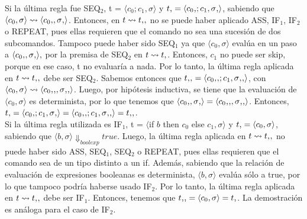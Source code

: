 \documentclass{article}
\begin{document}
Si la última regla fue SEQ$_{2}$, t = $\langle c_{0};c_{1}, \sigma\rangle$ y $t\textsc{\char13} = \langle c_{0}\textsc{\char13};c_{1}, \sigma\textsc{\char13}\rangle$, sabiendo que $\langle c_{0}, \sigma\rangle \leadsto \langle c_{0}\textsc{\char13}, \sigma\textsc{\char13}\rangle$. Entonces, en $t \leadsto t\textsc{\char13}\textsc{\char13}$ no se puede haber aplicado ASS, IF$_{1}$, IF$_{2}$ o REPEAT, pues ellas requieren que el comando no sea una sucesión de dos subcomandos. Tampoco puede haber sido SEQ$_{1}$ ya que $\langle c_{0}, \sigma\rangle$ evalúa en un paso a $\langle c_{0}\textsc{\char13}, \sigma\textsc{\char13}\rangle,$ por la premisa de SEQ$_{2}$ en $t \leadsto t\textsc{\char13}$. Entonces, $c_{1}$ no puede ser skip, porque en ese caso, t no evaluaría a nada. Por lo tanto, la última regla aplicada en $t \leadsto t\textsc{\char13}\textsc{\char13}$ debe ser SEQ$_{2}$. Sabemos entonces que $t\textsc{\char13}\textsc{\char13} = \langle c_{0}\textsc{\char13}\textsc{\char13}; c_{1}, \sigma\textsc{\char13}\textsc{\char13}\rangle$, con $\langle c_{0}, \sigma\rangle \leadsto \langle c_{0}\textsc{\char13}\textsc{\char13}, \sigma\textsc{\char13}\textsc{\char13}\rangle$. Luego, por hipótesis inductiva, se tiene que la evaluación de $\langle c_{0}, \sigma\rangle$ es determinista, por lo que tenemos que $\langle c_{0}\textsc{\char13}, \sigma\textsc{\char13}\rangle = \langle c_{0}\textsc{\char13}\textsc{\char13}, \sigma\textsc{\char13}\textsc{\char13}\rangle$. Entonces, $t\textsc{\char13} = \langle c_{0}\textsc{\char13}; c_{1}, \sigma\textsc{\char13}\rangle = \langle c_{0}\textsc{\char13}\textsc{\char13}; c_{1}, \sigma\textsc{\char13}\textsc{\char13}\rangle = t\textsc{\char13}\textsc{\char13}$.\\

Si la última regla utilizada es IF$_{1}$, t = $\langle $if $ b$ then $c_{0}$ else $c_{1}, \sigma\rangle$ y $t\textsc{\char13} = \langle c_{0}, \sigma\rangle$, sabiendo que $\langle b, \sigma\rangle \Downarrow_{boolexp} true$. Luego, la última regla aplicada en $t\leadsto t\textsc{\char13}\textsc{\char13}$ no puede haber sido ASS, SEQ$_{1}$, SEQ$_{2}$ o REPEAT, pues ellas requieren que el comando sea de un tipo distinto a un if. Además, sabiendo que la relación de evaluación de expresiones booleanas es determinista, $\langle b, \sigma\rangle$ evalúa sólo a true, por lo que tampoco podría haberse usado IF$_{2}$. Por lo tanto, la última regla aplicada en $t\leadsto t\textsc{\char13}\textsc{\char13}$ debe ser IF$_{1}$. Entonces, tenemos que $t\textsc{\char13}\textsc{\char13} = \langle c_{0}, \sigma\rangle = t\textsc{\char13}$. La demostración es análoga para el caso de IF$_{2}$.\\
\end{document}
